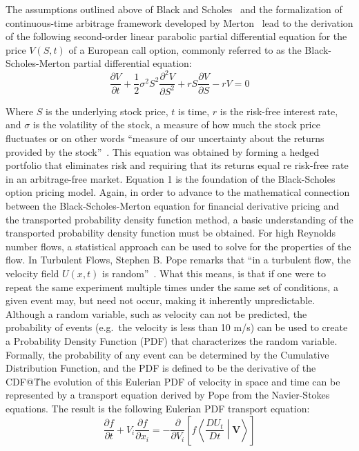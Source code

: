 \documentclass[12pt, onecolumn, journal]{IEEEtran}
\begin{document}
The assumptions outlined above of Black and Scholes~\cite{BlackScholes1973} and the formalization of continuous-time arbitrage framework developed by Merton~\cite{Merton1973} lead to the derivation of the following second-order linear parabolic partial differential equation for the price $V(S,t)$ of a European call option, commonly referred to as the Black-Scholes-Merton partial differential equation:
\begin{equation}
\frac{\partial V}{\partial t} + \frac{1}{2} \sigma^2 S^2 \frac{\partial^2 V}{\partial S^2} + rS \frac{\partial V}{\partial S} - rV = 0
\end{equation}

\noindent Where $S$ is the underlying stock price, $t$ is time, $r$ is the risk-free interest rate, and $\sigma$ is the volatility of the stock, a measure of how much the stock price fluctuates or on other words “measure of our uncertainty about the returns provided by the stock”~\cite{Hull2022}. This equation was obtained by forming a hedged portfolio that eliminates risk and requiring that its returns equal re risk-free rate in an arbitrage-free market. Equation 1 is the foundation of the Black-Scholes option pricing model. 
Again, in order to advance to the mathematical connection between the Black-Scholes-Merton equation for financial derivative pricing and the transported probability density function method, a basic understanding of the transported probability density function must be obtained. For high Reynolds number flows, a statistical approach can be used to solve for the properties of the flow. In Turbulent Flows, Stephen B. Pope remarks that “in a turbulent flow, the velocity field $U(x,t)$ is random”~\cite{Pope2000}. What this means, is that if one were to repeat the same experiment multiple times under the same set of conditions, a given event may, but need not occur, making it inherently unpredictable. Although a random variable, such as velocity can not be predicted, the probability of events (e.g.\ the velocity is less than 10 m/s) can be used to create a Probability Density Function (PDF) that characterizes the random variable. Formally, the probability of any event can be determined by the Cumulative Distribution Function, and the PDF is defined to be the derivative of the CDF@\. The evolution of this Eulerian PDF of velocity in space and time can be represented by a transport equation derived by Pope from the Navier-Stokes equations. The result is the following Eulerian PDF transport equation:
\begin{equation}
\frac{\partial f}{\partial t} + V_i \frac{\partial f}{\partial x_i} = - \frac{\partial}{\partial V_i} \left[f \left \langle \frac{DU_t}{Dt} \middle| \mathbf{V} \right \rangle \right]
\end{equation}
\end{document}
